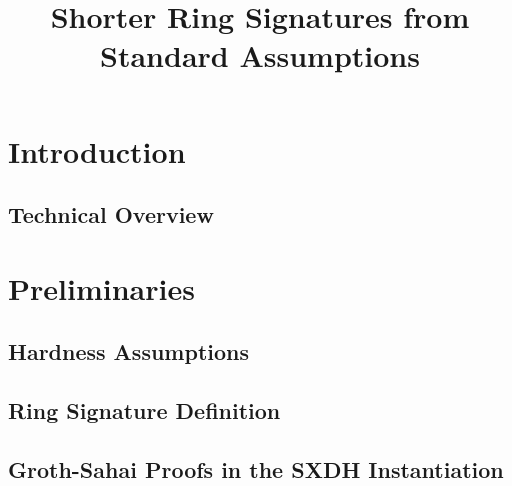 \documentclass{llncs}
\title{Shorter Ring Signatures from Standard Assumptions}
\begin{document}
\maketitle

\begin{abstract}
    
\end{abstract} 

%

\section{Introduction}

     

   \subsection{Technical Overview} \label{sec:tech-overview}

	


    	



\section{Preliminaries}

	

	\subsection{Hardness Assumptions}

	

		\subsection{Ring Signature Definition}
    
            		

	\subsection{Groth-Sahai Proofs in the SXDH Instantiation} \label{sec:gs-proofs}
\end{document}
